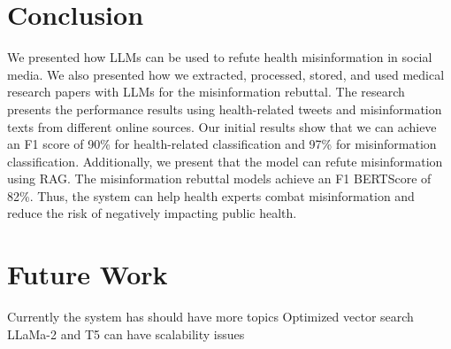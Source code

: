 \section{Conclusion}
We presented how LLMs can be used to refute health misinformation in social media. 
We also presented how we extracted, processed, stored, and used medical research papers with LLMs for the misinformation rebuttal. 
The research presents the performance results using health-related tweets and misinformation texts from different online sources. Our  initial results show that we can achieve an F1 score of 90\% for health-related classification and 97\% for misinformation classification. Additionally, we present that the model can refute misinformation using RAG. The misinformation rebuttal models achieve an F1 BERTScore of 82\%. Thus, the system can help health experts combat misinformation and reduce the risk of negatively impacting public health.

\section{Future Work}
Currently the system has should have more topics
Optimized vector search
LLaMa-2 and T5 can have scalability issues


%
